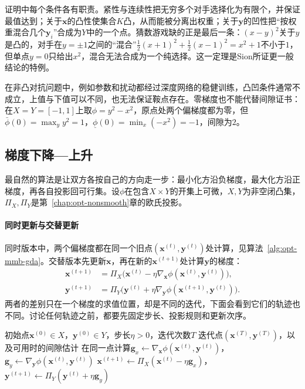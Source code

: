 证明中每个条件各有职责。紧性与连续性把无穷多个对手选择化为有限个，并保证最值达到；关于$\bm x$的凸性使集合$K$凸，从而能被分离出权重；关于$\bm y$的凹性把“按权重混合几个$\bm y_i$”合成为$Y$中的一个点。猜数游戏缺的正是最后一条：$(x-y)^2$关于$y$是凸的，对手在$y=\pm1$之间的“混合”$\frac12(x+1)^2+\frac12(x-1)^2=x^2+1$不小于$1$，但单点$y=0$只给出$x^2$，混合无法合成为一个纯选择。这一定理是Sion所证更一般结论的特例\cite{sion1958}。

在非凸对抗问题中，例如参数和扰动都经过深度网络的稳健训练，凸凹条件通常不成立，上值与下值可以不同，也无法保证鞍点存在。零梯度也不能代替间隙证书：在$X=Y=[-1,1]$上取$\phi=y^2-x^2$，原点处两个偏梯度都为零，但$\bar\phi(0)=\max_y y^2=1$，$\underline\phi(0)=\min_x(-x^2)=-1$，间隙为$2$。

\subsection{梯度下降—上升}
\label{sec:opt-mmb-gda}

最自然的算法是让双方各按自己的方向走一步：最小化方沿负梯度，最大化方沿正梯度，再各自投影回可行集。设$\phi$在包含$X\times Y$的开集上可微，$X,Y$为非空闭凸集，$\Pi_X,\Pi_Y$是第~\ref{chap:opt-nonsmooth}章的欧氏投影。

\paragraph{同时更新与交替更新}
同时版本中，两个偏梯度都在同一个旧点$(\bm x^{(t)},\bm y^{(t)})$处计算，见算法~\ref{alg:opt-mmb-gda}。交替版本先更新$\bm x$，再在新的$\bm x^{(t+1)}$处计算$\bm y$的梯度：
\[
\begin{aligned}
\bm x^{(t+1)}&=\Pi_X\bigl(\bm x^{(t)}-\eta\nabla_{\bm x}\phi(\bm x^{(t)},\bm y^{(t)})\bigr),\\
\bm y^{(t+1)}&=\Pi_Y\bigl(\bm y^{(t)}+\eta\nabla_{\bm y}\phi(\bm x^{(t+1)},\bm y^{(t)})\bigr).
\end{aligned}
\]
两者的差别只在一个梯度的求值位置，却是不同的迭代，下面会看到它们的轨迹也不同。讨论任何轨迹之前，都要先固定步长、投影规则和更新次序。

\begin{algorithm}[投影同时梯度下降—上升]
\label{alg:opt-mmb-gda}
\begin{algorithmic}[1]
\Require 初始点$\bm x^{(0)}\in X$，$\bm y^{(0)}\in Y$，步长$\eta>0$，迭代次数$T$
\Ensure 迭代点$(\bm x^{(T)},\bm y^{(T)})$，以及可用时的间隙估计
  \State 在同一点计算$\bm g_x\gets\nabla_{\bm x}\phi(\bm x^{(t)},\bm y^{(t)})$，$\bm g_y\gets\nabla_{\bm y}\phi(\bm x^{(t)},\bm y^{(t)})$
  \State $\bm x^{(t+1)}\gets\Pi_X(\bm x^{(t)}-\eta\bm g_x)$，$\bm y^{(t+1)}\gets\Pi_Y(\bm y^{(t)}+\eta\bm g_y)$
\EndFor
\end{algorithmic}
\end{algorithm}

